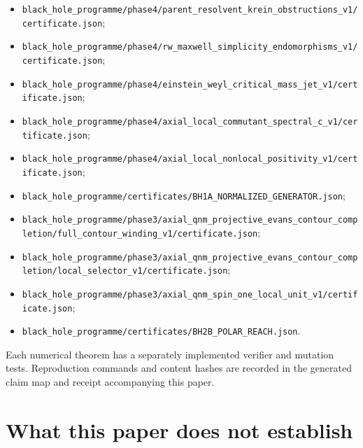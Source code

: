 \documentclass[11pt]{article}
\theoremstyle{definition}
\theoremstyle{remark}
\newcommand{\cert}[1]{\nolinkurl{#1}}
\begin{document}
\begin{itemize}
\item \cert{black_hole_programme/phase4/parent_resolvent_krein_obstructions_v1/certificate.json};
\item \cert{black_hole_programme/phase4/rw_maxwell_simplicity_endomorphisms_v1/certificate.json};
\item \cert{black_hole_programme/phase4/einstein_weyl_critical_mass_jet_v1/certificate.json};
\item \cert{black_hole_programme/phase4/axial_local_commutant_spectral_c_v1/certificate.json};
\item \cert{black_hole_programme/phase4/axial_local_nonlocal_positivity_v1/certificate.json};
\item \cert{black_hole_programme/certificates/BH1A_NORMALIZED_GENERATOR.json};
\item \cert{black_hole_programme/phase3/axial_qnm_projective_evans_contour_completion/full_contour_winding_v1/certificate.json};
\item \cert{black_hole_programme/phase3/axial_qnm_projective_evans_contour_completion/local_selector_v1/certificate.json};
\item \cert{black_hole_programme/phase3/axial_qnm_spin_one_local_unit_v1/certificate.json};
\item \cert{black_hole_programme/certificates/BH2B_POLAR_REACH.json}.
\end{itemize}
Each numerical theorem has a separately implemented verifier and mutation
tests.  Reproduction commands and content hashes are recorded in the generated
claim map and receipt accompanying this paper.

\section{What this paper does not establish}
\end{document}

